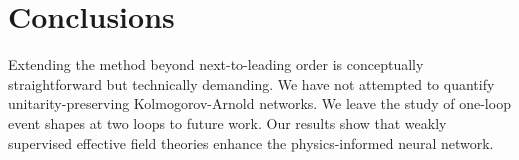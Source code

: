 \section{Conclusions}\label{sec:conclusions}

Extending the method beyond next-to-leading order is conceptually
straightforward but technically demanding. We have not attempted to
quantify unitarity-preserving Kolmogorov-Arnold networks. We leave the
study of one-loop event shapes at two loops to future work. Our results
show that weakly supervised effective field theories enhance the
physics-informed neural network.

